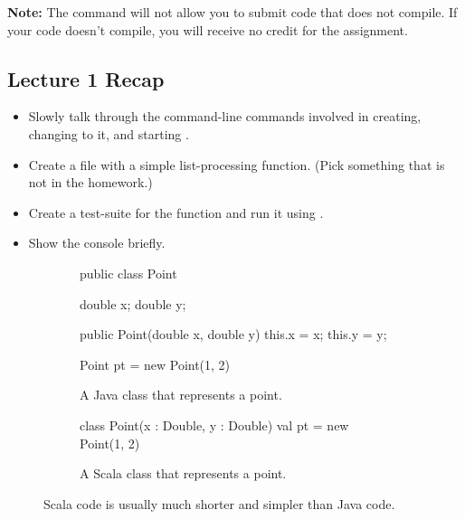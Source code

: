 \documentclass{book}
\begin{document}
\textbf{Note:}  The command will not allow you to submit code that does not
compile. If your code doesn't compile, you will receive no credit for the
assignment.

\newlecture

\begin{instructor}

\section{Lecture 1 Recap}

\begin{itemize}

  \item Slowly talk through the command-line commands involved in creating,
  changing to it, and starting \sbt{}.

  \item Create a file with a simple list-processing function. (Pick something
  that is not in the homework.)

  \item Create a test-suite for the function and run it using \sbt{}.

  \item Show the \sbt{} console briefly.

\end{itemize}

\end{instructor}

\begin{figure}
\begin{subfigure}[b]{.45\textwidth}
\begin{javacode}
public class Point {

  double x;
  double y;

  public Point(double x, double y) {
    this.x = x;
    this.y = y;
  }

}

Point pt = new Point(1, 2)
\end{javacode}
\caption{A Java class that represents a point.}\label{javapoint}
\end{subfigure}
\vrule
%
\begin{subfigure}[b]{.45\textwidth}
\begin{scalacode}
class Point(x : Double, y : Double)
val pt = new Point(1, 2)
\end{scalacode}
\caption{A Scala class that represents a point.}\label{scalapoint}
\end{subfigure}
\caption{Scala code is usually much shorter and simpler than Java code.}
\end{figure}
\end{document}
